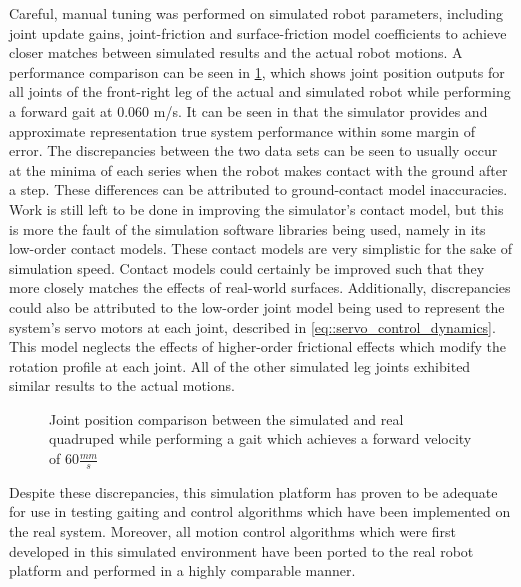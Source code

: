 		Careful, manual tuning was performed on simulated robot parameters, including joint update gains, joint-friction and surface-friction model coefficients to achieve closer matches between simulated results and the actual robot motions. A performance comparison can be seen in \ref{fig::sim_performance_comparison}, which shows joint position outputs for all joints of the front-right leg of the actual and simulated robot while performing a forward gait at $0.060$ m/s. It can be seen in  that the simulator provides and approximate representation true system performance within some margin of error. The discrepancies between the two data sets can be seen to usually occur at the minima of each series when the robot makes contact with the ground after a step. These differences can be attributed to ground-contact model inaccuracies. Work is still left to be done in improving the simulator's contact model, but this is more the fault of the simulation software libraries being used, namely in its low-order contact models. These contact models are very simplistic for the sake of simulation speed. Contact models could certainly be improved such that they more closely matches the effects of real-world surfaces. Additionally, discrepancies could also be attributed to the low-order joint model being used to represent the system's servo motors at each joint, described in \ref{eq::servo_control_dynamics}. This model neglects the effects of higher-order frictional effects which modify the rotation profile at each joint. All of the other simulated leg joints exhibited similar results to the actual motions.
			\begin{figure}[!t]
				\centering
				\caption{Joint position comparison between the simulated and real quadruped while performing a gait which achieves a forward velocity of $60\frac{mm}{s}$}
				\label{fig::sim_performance_comparison}
			\end{figure}
		Despite these discrepancies, this simulation platform has proven to be adequate for use in testing gaiting and control algorithms which have been implemented on the real system. Moreover, all motion control algorithms which were first developed in this simulated environment have been ported to the real robot platform and performed in a highly comparable manner.

